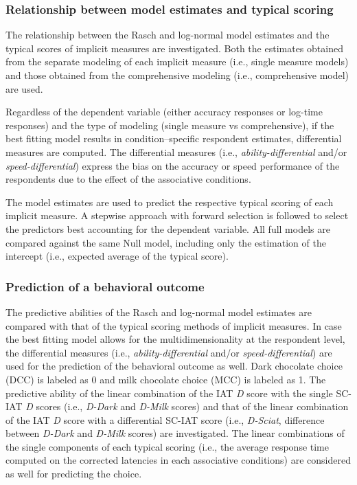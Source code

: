 \documentclass[12pt]{book}
\begin{document}
\subsubsection{Relationship between model estimates and typical scoring}

The relationship between the Rasch and log-normal model estimates and the typical scores of implicit measures are investigated. 
Both the estimates obtained from the separate modeling of each implicit measure (i.e., single measure models) and those obtained from the comprehensive modeling (i.e., comprehensive model) are used. 

Regardless of the dependent variable (either accuracy responses or log-time responses) and the type of modeling (single measure vs comprehensive), if the best fitting model results in condition--specific respondent estimates, differential measures are computed. 
The differential measures (i.e., \emph{ability-differential} and/or \emph{speed-differential}) express the bias on the accuracy or speed performance of the respondents due to the effect of the associative conditions. 

The model estimates are used to predict the respective typical scoring of each implicit measure. 
A stepwise approach with forward selection is followed to select the predictors best accounting for the dependent variable. 
All full models are compared against the same Null model, including only the estimation of the intercept (i.e., expected average of the typical score).

\subsubsection{Prediction of a behavioral outcome}

The predictive abilities of the Rasch and log-normal model estimates are compared with that of the typical scoring methods of implicit measures. 
In case the best fitting model allows for the multidimensionality at the respondent level, the differential measures (i.e., \emph{ability-differential} and/or \emph{speed-differential}) are used for the prediction of the behavioral outcome as well.
Dark chocolate choice (DCC) is labeled as 0 and milk chocolate choice (MCC) is labeled as 1.
The predictive ability of the linear combination of the IAT \emph{D} score with the single SC-IAT \emph{D} scores (i.e., \emph{D-Dark} and \emph{D-Milk} scores) and that of the linear combination of the IAT \emph{D} score with a differential SC-IAT score (i.e., \emph{D-Sciat}, difference between \emph{D-Dark} and \emph{D-Milk} scores) are investigated.
The linear combinations of the single components of each typical scoring (i.e., the average response time computed on the corrected latencies in each associative conditions) are considered as well for predicting the choice. 
\end{document}
